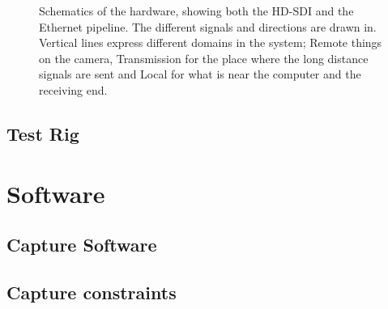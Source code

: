 \begin{sidewaysfigure}
	\caption{Schematics of the hardware, showing both the HD-SDI and the Ethernet pipeline. The different signals and directions are drawn in. 
		Vertical lines express different domains in the system; Remote things on the camera, Transmission for the place where the long distance signals are sent and Local for what is 
		near the computer and the receiving end.}
	\label{fig:hw.schema}
\end{sidewaysfigure}

\subsection{Test Rig}\label{sec:test.rig}

\section{Software}

\subsection{Capture Software}

\subsection{Capture constraints}